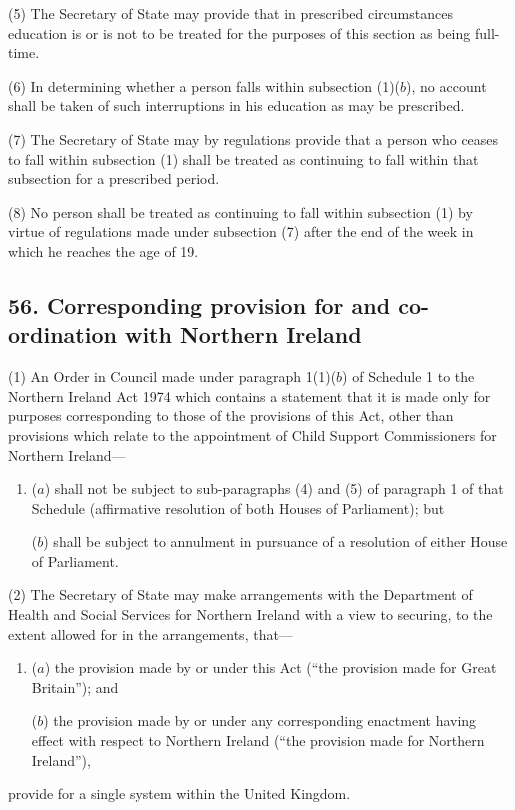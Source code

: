 \documentclass[12pt,a4paper]{article}
\begin{document}
(5) The Secretary of State may provide that in prescribed circumstances education is or is not to be treated for the purposes of this section as being full-time.

(6) In determining whether a person falls within subsection (1)($b$), no account shall be taken of such interruptions in his education as may be prescribed.

(7) The Secretary of State may by regulations provide that a person who ceases to fall within subsection (1)  shall be treated as continuing to fall within that subsection for a prescribed period.

(8) No person shall be treated as continuing to fall within subsection (1)  by virtue of regulations made under subsection (7)  after the end of the week in which he reaches the age of 19.


\subsection{56. Corresponding provision for and co-ordination with Northern Ireland}

(1) An Order in Council made under paragraph 1(1)($b$)  of Schedule 1 to the Northern Ireland Act 1974 which contains a statement that it is made only for purposes corresponding to those of the provisions of this Act, other than provisions which relate to the appointment of Child Support Commissioners for Northern Ireland—
\begin{enumerate}\item[]
($a$) shall not be subject to sub-paragraphs (4)  and (5)  of paragraph 1 of that Schedule (affirmative resolution of both Houses of Parliament); but

($b$) shall be subject to annulment in pursuance of a resolution of either House of Parliament.
\end{enumerate}

(2) The Secretary of State may make arrangements with the Department of Health and Social Services for Northern Ireland with a view to securing, to the extent allowed for in the arrangements, that—
\begin{enumerate}\item[]
($a$) the provision made by or under this Act (“the provision made for Great Britain”); and

($b$) the provision made by or under any corresponding enactment having effect with respect to Northern Ireland (“the provision made for Northern Ireland”),
\end{enumerate}
provide for a single system within the United Kingdom.
\end{document}

